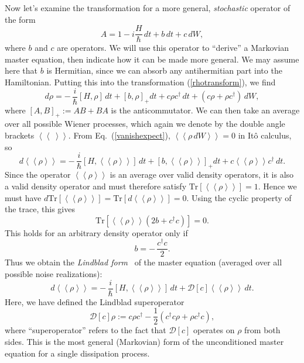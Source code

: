 \documentclass[12pt,aps,onecolum,superscriptaddress,footinbib,floatfix,showpacs]{revtex4-1}
\newcommand{\dlangle}{\left\langle\!\left\langle}
\newcommand{\drangle}{\right\rangle\!\right\rangle}
\def\dexpct#1{\dlangle{#1}\drangle}
\begin{document}
Now let's examine the transformation for a more general, \textit{stochastic}
operator of the form
\begin{equation}
  A = 1-i\frac{H}{\hbar}\,dt + b\,dt + c\, dW,
\end{equation}
where $b$ and $c$ are operators.
We will use this operator to ``derive'' a Markovian master equation, then 
indicate how it can be made more general.
We may assume here that $b$ is Hermitian, since we can absorb any antihermitian
part into the Hamiltonian.
Putting this into the transformation (\ref{rhotransform}), we find
\begin{equation}
  d\rho = -\,\frac{i}{\hbar}[H,\rho]\,dt + [b, \rho]_+dt + c\rho c^\dagger\,dt
   + \left(c\rho+\rho c^\dagger\right)\, dW,
  \label{masteqbc}
\end{equation}
where $[A,B]_+:=AB+BA$ is the anticommutator.
We can then take an average over all possible Wiener processes, which
again we denote by the double angle brackets 
$\dexpct{~}$.  From Eq.~(\ref{vanishexpect}), $\dexpct{\rho\,dW}=0$ in It\^o calculus, so
\begin{equation}
  d\dexpct{\rho} = -\,\frac{i}{\hbar}\left[H,\dexpct{\rho}\right]\,dt
     + \left[b,\dexpct{\rho}\right]_+dt + c\dexpct{\rho}\!c^\dagger\,dt.
\end{equation}
Since the operator $\dexpct{\rho}$ is an average over valid density
operators, it is also a valid density operator and must therefore
satisfy $\mathrm{Tr}[\dexpct{\rho}]=1$.  Hence we must have
$d\mathrm{Tr}[\dexpct{\rho}]= \mathrm{Tr}[d\!\dexpct{\rho}]=0$.  Using
the cyclic property of the trace, this gives
\begin{equation}
  \mathrm{Tr}\left[\dexpct{\rho}\left(2b+c^\dagger c\right)\right]=0.
\end{equation}
This holds for an arbitrary density operator only if
\begin{equation}
  b=-\,\frac{c^\dagger c}{2}.
\end{equation}
Thus we obtain the \textit{Lindblad form}~\cite{Lindblad76} of the
master equation (averaged over all possible noise realizations):
\begin{equation}
  d\dexpct{\rho} = -\,\frac{i}{\hbar}\left[H,\dexpct{\rho}\right]\,dt
     + \mathcal{D}[c]\!\dexpct{\rho}\,dt.
\end{equation}
Here, we have defined the Lindblad superoperator
\begin{equation}
  \mathcal{D}[c]\rho := c\rho c^\dagger - \frac{1}{2}\left(c^\dagger c\rho + \rho c^\dagger c\right),
  \label{lindbladsuperop}
\end{equation}
where ``superoperator'' refers to the fact that $\mathcal{D}[c]$ operates 
on $\rho$ from both sides.
This is the most general (Markovian) form of the unconditioned 
master equation for a single dissipation process.
\end{document}
